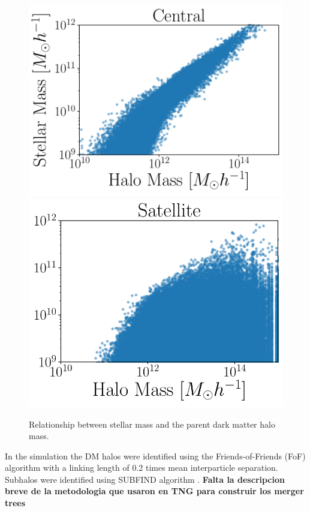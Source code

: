 \documentclass[a4paper,fleqn,usenatbib]{mnras}
\begin{document}
\begin{figure}
    \centering
     \includegraphics[width=1\columnwidth]{figuras/CH.pdf}
    \includegraphics[width=0.9\columnwidth]{figuras/SH.pdf}
    \caption{Relationship between stellar mass and the parent dark matter halo mass.}
    \label{fig:stellar_to_halo}
\end{figure}



In the simulation the DM halos were identified using the
Friends-of-Friends (FoF) algorithm with a linking length of 0.2 times
mean interparticle separation. 
Subhalos were identified using SUBFIND algorithm
\citep{2015MNAS.449...49R}. 
\textbf{Falta la descripcion breve de la metodologia que usaron en TNG para construir
los merger trees} 
\end{document}
